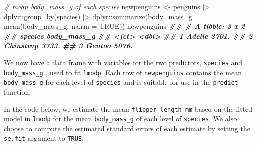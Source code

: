 \documentclass[
]{book}
\newenvironment{Shaded}{\begin{snugshade}}{\end{snugshade}}
\newcommand{\AttributeTok}[1]{\textcolor[rgb]{0.77,0.63,0.00}{#1}}
\newcommand{\CommentTok}[1]{\textcolor[rgb]{0.56,0.35,0.01}{\textit{#1}}}
\newcommand{\ConstantTok}[1]{\textcolor[rgb]{0.00,0.00,0.00}{#1}}
\newcommand{\DocumentationTok}[1]{\textcolor[rgb]{0.56,0.35,0.01}{\textbf{\textit{#1}}}}
\newcommand{\FunctionTok}[1]{\textcolor[rgb]{0.00,0.00,0.00}{#1}}
\newcommand{\NormalTok}[1]{#1}
\newcommand{\OtherTok}[1]{\textcolor[rgb]{0.56,0.35,0.01}{#1}}
\newcommand{\SpecialCharTok}[1]{\textcolor[rgb]{0.00,0.00,0.00}{#1}}
\theoremstyle{definition}
\theoremstyle{definition}
\theoremstyle{definition}
\theoremstyle{definition}
\theoremstyle{remark}
\begin{document}
\begin{Shaded}
\begin{Highlighting}[]
\CommentTok{\# mean body\_mass\_g of each species}
\NormalTok{newpenguins }\OtherTok{\textless{}{-}}\NormalTok{ penguins }\SpecialCharTok{|\textgreater{}}
\NormalTok{  dplyr}\SpecialCharTok{::}\FunctionTok{group\_by}\NormalTok{(species) }\SpecialCharTok{|\textgreater{}}
\NormalTok{  dplyr}\SpecialCharTok{::}\FunctionTok{summarize}\NormalTok{(}\AttributeTok{body\_mass\_g =} \FunctionTok{mean}\NormalTok{(body\_mass\_g, }\AttributeTok{na.rm =} \ConstantTok{TRUE}\NormalTok{))}
\NormalTok{newpenguins}
\DocumentationTok{\#\# \# A tibble: 3 x 2}
\DocumentationTok{\#\#   species   body\_mass\_g}
\DocumentationTok{\#\#   \textless{}fct\textgreater{}           \textless{}dbl\textgreater{}}
\DocumentationTok{\#\# 1 Adelie          3701.}
\DocumentationTok{\#\# 2 Chinstrap       3733.}
\DocumentationTok{\#\# 3 Gentoo          5076.}
\end{Highlighting}
\end{Shaded}

We now have a data frame with variables for the two predictors, \texttt{species} and \texttt{body\_mass\_g} , used to fit \texttt{lmodp}. Each row of \texttt{newpenguins} contains the mean \texttt{body\_mass\_g} for each level of \texttt{species} and is suitable for use in the \texttt{predict} function.

In the code below, we estimate the mean \texttt{flipper\_length\_mm} based on the fitted model in \texttt{lmodp} for the mean \texttt{body\_mass\_g} of each level of \texttt{species}. We also choose to compute the estimated standard errors of
each estimate by setting the \texttt{se.fit} argument to \texttt{TRUE}.

\begin{Shaded}
\end{Shaded}
\end{document}
